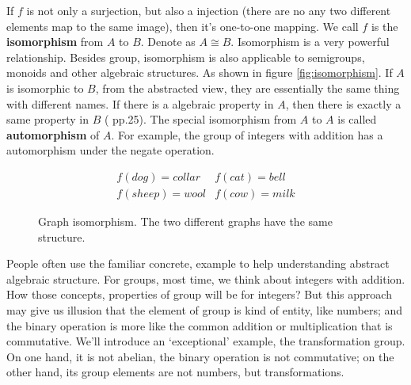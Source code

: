 \documentclass[b5paper]{article}
\begin{document}
If $f$ is not only a surjection, but also a injection (there are no any two different elements map to the same image), then it's one-to-one mapping. We call $f$ is the \textbf{isomorphism} from $A$ to $B$. Denote as $A \cong B$. Isomorphism is a very powerful relationship. Besides group, isomorphism is also applicable to semigroups, monoids and other algebraic structures. As shown in figure \ref{fig:isomorphism}. If $A$ is isomorphic to $B$, from the abstracted view, they are essentially the same thing with different names. If there is a algebraic property in $A$, then there is exactly a same property in $B$ (\cite{ZhangHeRui1978} pp.25). The special isomorphism from $A$ to $A$ is called \textbf{automorphism} of $A$. For example, the group of integers with addition has a automorphism under the negate operation.

\begin{figure}[htbp]
\centering
{}
\[
\begin{array}{rl}
f(dog) = collar & f(cat) = bell \\
f(sheep) = wool & f(cow) = milk
\end{array}
\]
\caption{Graph isomorphism. The two different graphs have the same structure.}
\label{fig:graph-isomorphism}
\end{figure}

People often use the familiar concrete, example to help understanding abstract algebraic structure. For groups, most time, we think about integers with addition. How those concepts, properties of group will be for integers? But this approach may give us illusion that the element of group is kind of entity, like numbers; and the binary operation is more like the common addition or multiplication that is commutative. We'll introduce an `exceptional' example, the transformation group. On one hand, it is not abelian, the binary operation is not commutative; on the other hand, its group elements are not numbers, but transformations.
\end{document}
